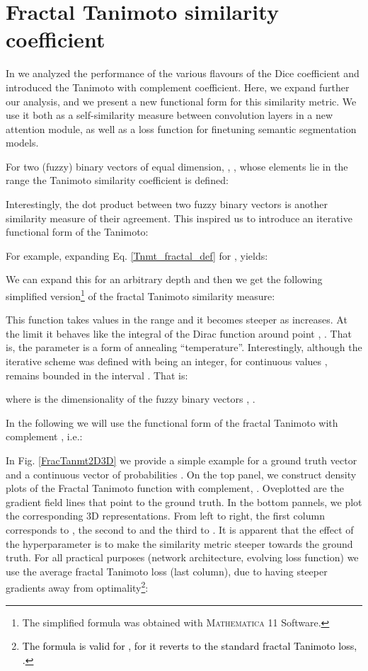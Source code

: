 \documentclass[times, 5p]{elsarticle}
\begin{document}
\section{Fractal Tanimoto similarity coefficient}
\label{section_fractal_tanimoto_similarity}

In \citep{DIAKOGIANNIS202094} we analyzed the performance of the various flavours of the Dice coefficient and introduced the Tanimoto with complement coefficient. Here, we expand further our analysis, and we present a new  functional form for this similarity metric. We use it both as a  
self-similarity measure between convolution layers in a new attention module, as well as a loss function for finetuning semantic segmentation models. 


For two (fuzzy) binary vectors of equal dimension, , , whose elements lie in the range   the Tanimoto similarity coefficient is defined:

 Interestingly, the dot product  between two fuzzy binary vectors  is another similarity measure of their agreement. This inspired us to introduce an iterative functional form of the Tanimoto:

For example, expanding Eq. \eqref{Tnmt_fractal_def} for , yields: 

We can expand this for an arbitrary depth  and then we get the following simplified version\footnote{The simplified formula was obtained with \textsc{Mathematica 11} Software.} of the fractal Tanimoto similarity measure:

This function takes values in the range  and it becomes steeper as  increases. At the limit  it behaves like the integral of the  Dirac  function around point , .  That is, the parameter  is a form of annealing ``temperature''. Interestingly, although the iterative scheme was defined with  being an integer, for continuous values ,  remains bounded in the interval . That is:   

where  is the dimensionality of the fuzzy binary vectors , .   


In the following we will use the functional form of the fractal Tanimoto with complement \citep{DIAKOGIANNIS202094}, i.e.:


In Fig. \ref{FracTanmt2D3D} we provide a simple example for a ground truth vector  and a continuous vector of probabilities . On the top panel, we construct density plots of the Fractal Tanimoto function with complement, . Oveplotted are the gradient field lines that point to the ground truth. In the bottom pannels,  we plot the corresponding 3D representations.  From left to right, the first column corresponds to , the second to  and the third to . It is apparent that the effect of the  hyperparameter is to make the similarity metric steeper towards the ground truth. 
For all practical purposes (network architecture, evolving loss function) we use the average fractal Tanimoto loss (last column), due to having steeper gradients away from optimality\footnote{\textcolor{black}{The formula is valid for , for  it reverts to the standard fractal Tanimoto loss, .}}: 
\end{document}
